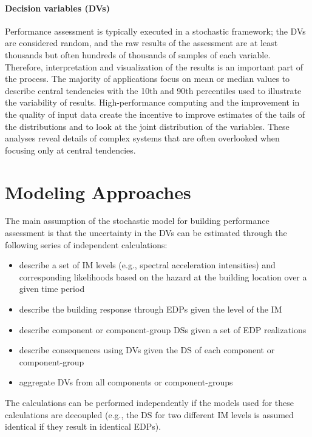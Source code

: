 \paragraph{Decision variables (DVs)} Performance assessment is typically executed in a stochastic framework; the DVs are considered random, and the raw results of the assessment are at least thousands but often hundreds of thousands of samples of each variable. Therefore, interpretation and visualization of the results is an important part of the process. The majority of applications focus on mean or median values to describe central tendencies with the 10th and 90th percentiles used to illustrate the variability of results. High-performance computing and the improvement in the quality of input data create the incentive to improve estimates of the tails of the distributions and to look at the joint distribution of the variables. These analyses reveal details of complex systems that are often overlooked when focusing only at central tendencies.

\section{Modeling Approaches}
\label{sec:perf_bldg_methods}

The main assumption of the stochastic model for building performance assessment is that the uncertainty in the DVs can be estimated through the following series of independent calculations: 

\begin{itemize}
    \item describe a set of IM levels (e.g., spectral acceleration intensities) and corresponding likelihoods based on the hazard at the building location over a given time period
    \item describe the building response through EDPs given the level of the IM
    \item describe component or component-group DSs given a set of EDP realizations
    \item describe consequences using DVs given the DS of each component or component-group
    \item aggregate DVs from all components or component-groups
\end{itemize}

The calculations can be performed independently if the models used for these calculations are decoupled (e.g., the DS for two different IM levels is assumed identical if they result in identical EDPs).

